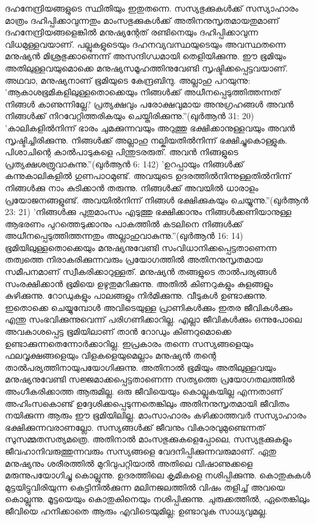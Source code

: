 ദഹനേന്ദ്രിയങ്ങളുടെ സ്ഥിതിയും ഇതുതന്നെ. സസ്യഭുക്കുകള്‍ക്ക് സസ്യാഹാരം മാത്രം ദഹിപ്പിക്കാവുന്നതും മാംസഭുക്കുകള്‍ക്ക് അതിനനുസൃതമായതുമാണ് ദഹനേന്ദ്രിയങ്ങളെങ്കില്‍ മനുഷ്യന്റേത് രണ്ടിനെയും ദഹിപ്പിക്കാവുന്ന വിധമുള്ളവയാണ്. പല്ലുകളുടെയും ദഹനവ്യവസ്ഥയുടെയും അവസ്ഥതന്നെ മനുഷ്യന്‍ മിശ്രഭുക്കാണെന്ന് അസന്ദിഗ്ധമായി തെളിയിക്കുന്നു.
ഈ ഭൂമിയും അതിലുള്ളവയുമൊക്കെ മനുഷ്യസമൂഹത്തിനുവേണ്ടി സൃഷ്ടിക്കപ്പെട്ടവയാണ്. അഥവാ, മനുഷ്യനാണ് ഭൂമിയുടെ കേന്ദ്രബിന്ദു. അല്ലാഹു പറയുന്നു: 'ആകാശഭൂമികളിലുള്ളതൊക്കെയും നിങ്ങള്‍ക്ക് അധീനപ്പെടുത്തിത്തന്നത് നിങ്ങള്‍ കാണുന്നില്ലേ? പ്രത്യക്ഷവും പരോക്ഷവുമായ അനുഗ്രഹങ്ങള്‍ അവന്‍ നിങ്ങള്‍ക്ക് നിറവേറ്റിത്തരികയും ചെയ്തിരിക്കുന്നു.''(ഖുര്‍ആന്‍ 31: 20)
'കാലികളില്‍നിന്ന് ഭാരം ചുമക്കുന്നവയും അറുത്തു ഭക്ഷിക്കാനുള്ളവയും അവന്‍ സൃഷ്ടിച്ചിരിക്കുന്നു. നിങ്ങള്‍ക്ക് അല്ലാഹു നല്കിയതില്‍നിന്ന് ഭക്ഷിച്ചുകൊള്ളുക. പിശാചിന്റെ കാല്‍പാടുകളെ പിന്തുടരരുത്. അവന്‍ നിങ്ങളുടെ പ്രത്യക്ഷശത്രുവാകുന്നു.''(ഖുര്‍ആന്‍ 6: 142)
'ഉറപ്പായും നിങ്ങള്‍ക്ക് കന്നുകാലികളില്‍ ഗുണപാഠമുണ്ട്. അവയുടെ ഉദരത്തില്‍നിന്നുള്ളതില്‍നിന്ന് നിങ്ങള്‍ക്കു നാം കുടിക്കാന്‍ തരുന്നു. നിങ്ങള്‍ക്ക് അവയില്‍ ധാരാളം പ്രയോജനങ്ങളുണ്ട്. അവയില്‍നിന്ന് നിങ്ങള്‍ ഭക്ഷിക്കുകയും ചെയ്യുന്നു.''(ഖുര്‍ആന്‍ 23: 21)
'നിങ്ങള്‍ക്കു പുതുമാംസം എടുത്തു ഭക്ഷിക്കാനും നിങ്ങള്‍ക്കണിയാനുള്ള ആഭരണം പുറത്തെടുക്കാനും പാകത്തില്‍ കടലിനെ നിങ്ങള്‍ക്ക് അധീനപ്പെടുത്തിത്തന്നതും അല്ലാഹുവാകുന്നു.''(ഖുര്‍ആന്‍ 16: 14)
ഭൂമിയിലുള്ളതൊക്കെയും മനുഷ്യനുവേണ്ടി സംവിധാനിക്കപ്പെട്ടതാണെന്ന തത്വത്തെ നിരാകരിക്കുന്നവരും പ്രയോഗത്തില്‍ അതിനനുസൃതമായ സമീപനമാണ് സ്വീകരിക്കാറുള്ളത്. മനുഷ്യന്‍ തങ്ങളുടെ താല്‍പര്യങ്ങള്‍ സംരക്ഷിക്കാന്‍ ഭൂമിയെ ഉഴുതുമറിക്കുന്നു. അതില്‍ കിണറുകളും കുളങ്ങളും കുഴിക്കുന്നു. റോഡുകളും പാലങ്ങളും നിര്‍മിക്കുന്നു. വീടുകള്‍ ഉണ്ടാക്കുന്നു. ഇതൊക്കെ ചെയ്യുമ്പോള്‍ അവിടെയുള്ള പ്രാണികള്‍ക്കും ഇതര ജീവികള്‍ക്കും എന്തു സംഭവിക്കുന്നുവെന്ന് പരിഗണിക്കാറില്ല. എല്ലാ ജീവികള്‍ക്കും ഒന്നുപോലെ അവകാശപ്പെട്ട ഭൂമിയിലാണ് താന്‍ റോഡും കിണറുമൊക്കെ ഉണ്ടാക്കുന്നതെന്നോര്‍ക്കാറില്ല. ഇപ്രകാരം തന്നെ സസ്യങ്ങളെയും ഫലവൃക്ഷങ്ങളെയും വിളകളെയുമെല്ലാം മനുഷ്യന്‍ തന്റെ താല്‍പര്യത്തിനായുപയോഗിക്കുന്നു. അതിനാല്‍ ഭൂമിയും അതിലുള്ളവയും മനുഷ്യനുവേണ്ടി സജ്ജമാക്കപ്പെട്ടതാണെന്ന സത്യത്തെ പ്രയോഗതലത്തില്‍ അംഗീകരിക്കാത്ത ആരുമില്ല.
ഒരു ജീവിയെയും കൊല്ലുകയില്ല എന്നതാണ് അഹിംസകൊണ്ട് ഉദ്ദേശിക്കപ്പെടുന്നതെങ്കിലും അതിനനുസൃതമായി ജീവിതം നയിക്കുന്ന ആരും ഈ ഭൂമിയിലില്ല. മാംസാഹാരം കഴിക്കാത്തവര്‍ സസ്യാഹാരം ഭക്ഷിക്കുന്നവരാണല്ലോ. സസ്യങ്ങള്‍ക്ക് ജീവനും വികാരവുമുണ്ടെന്നത് സുസമ്മതസത്യമത്രെ. അതിനാല്‍ മാംസഭുക്കുകളെപ്പോലെ, സസ്യഭുക്കുകളും ജീവഹാനിവരുത്തുന്നവരും സസ്യങ്ങളെ വേദനിപ്പിക്കുന്നവരുമാണ്.
ഏതു മനുഷ്യനും ശരീരത്തില്‍ മുറിവുപറ്റിയാല്‍ അതിലെ വിഷാണുക്കളെ മരുന്നുപയോഗിച്ചു കൊല്ലുന്നു. ഉദരത്തിലെ കൃമികളെ നശിപ്പിക്കുന്നു. കൊതുകുകള്‍ മുട്ടയിട്ടുവിരിയുന്ന കെട്ടിനില്‍ക്കുന്ന മലിനജലത്തില്‍ വിഷം തളിച്ച് അവയെ കൊല്ലുന്നു. മൂട്ടയെയും കൊതുകിനെയും നശിപ്പിക്കുന്നു. ചുരുക്കത്തില്‍, ഏതെങ്കിലും ജീവിയെ ഹനിക്കാതെ ആരും എവിടെയുമില്ല; ഉണ്ടാവുക സാധ്യവുമല്ല.
